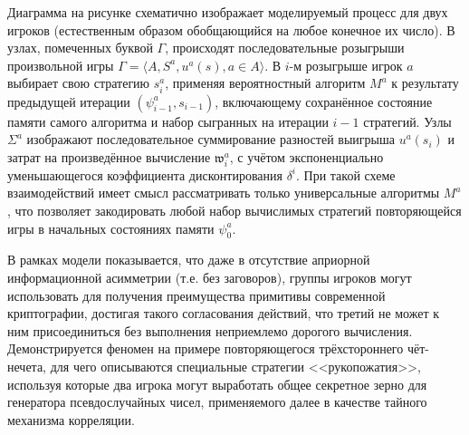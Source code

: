 Диаграмма на рисунке схематично изображает моделируемый процесс для двух игроков (естественным образом обобщающийся на любое конечное их число). В узлах, помеченных буквой $\Gamma$, происходят последовательные розыгрыши произвольной игры $\Gamma = \langle A, S^a, u^a(s), a \in A \rangle$. В $i$-м розыгрыше игрок $a$ выбирает свою стратегию $s^a_i$, применяя вероятностный алгоритм $M^a$ к результату предыдущей итерации $(\psi^a_{i-1}, s_{i-1})$, включающему сохранённое состояние памяти самого алгоритма и набор сыгранных на итерации $i-1$ стратегий. Узлы $\Sigma^a$ изображают последовательное суммирование разностей выигрыша $u^a(s_i)$ и затрат на произведённое вычисление $\mathfrak{w}^a_i$, с учётом экспоненциально уменьшающегося коэффициента дисконтирования $\delta^i$. При такой схеме взаимодействий имеет смысл рассматривать только универсальные алгоритмы $M^a$, что позволяет закодировать любой набор вычислимых стратегий повторяющейся игры в начальных состояниях памяти $\psi^a_0$.

В рамках модели показывается, что даже в отсутствие априорной информационной асимметрии (т.е. без заговоров), группы игроков могут использовать для получения преимущества примитивы современной криптографии, достигая такого согласования действий, что третий не может к ним присоединиться без выполнения неприемлемо дорогого вычисления. Демонстрируется феномен на примере повторяющегося трёхстороннего чёт-нечета, для чего описываются специальные стратегии <<рукопожатия>>, используя которые два игрока могут выработать общее секретное зерно для генератора псевдослучайных чисел, применяемого далее в качестве тайного механизма корреляции.

